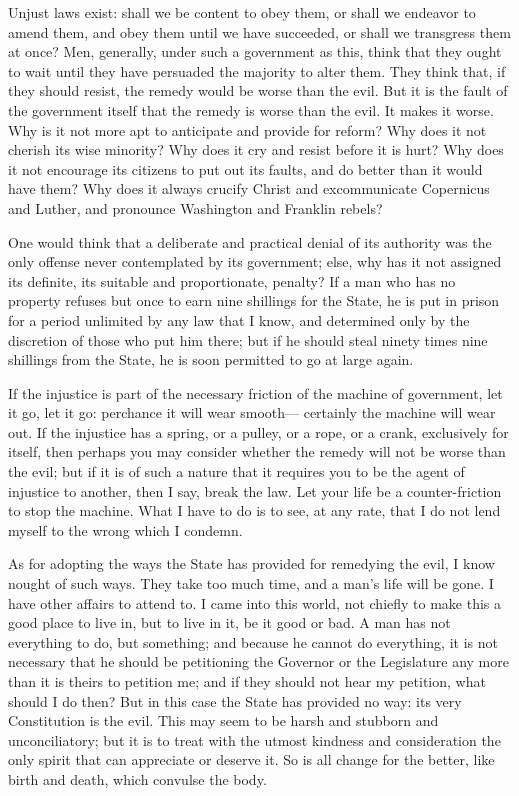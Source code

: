 \documentclass[letterpaper,12pt]{article}
\begin{document}
Unjust laws exist: shall we be content to obey them, or shall we endeavor to
amend them, and obey them until we have succeeded, or shall we transgress them
at once? Men, generally, under such a government as this, think that they ought
to wait until they have persuaded the majority to alter them. They think that,
if they should resist, the remedy would be worse than the evil.  But it is the
fault of the government itself that the remedy is worse than the evil. It makes
it worse. Why is it not more apt to anticipate and provide for reform? Why does
it not cherish its wise minority? Why does it cry and resist before it is hurt?
Why does it not encourage its citizens to put out its faults, and do better than
it would have them? Why does it always crucify Christ and excommunicate
Copernicus and Luther, and pronounce Washington and Franklin rebels?

One would think that a deliberate and practical denial of its authority was the
only offense never contemplated by its government; else, why has it not assigned
its definite, its suitable and proportionate, penalty? If a man who has no
property refuses but once to earn nine shillings for the State, he is put in
prison for a period unlimited by any law that I know, and determined only by the
discretion of those who put him there; but if he should steal ninety times nine
shillings from the State, he is soon permitted to go at large again.

If the injustice is part of the necessary friction of the machine of government,
let it go, let it go: perchance it will wear smooth--- certainly the machine
will wear out. If the injustice has a spring, or a pulley, or a rope, or
a crank, exclusively for itself, then perhaps you may consider whether the
remedy will not be worse than the evil; but if it is of such a nature that it
requires you to be the agent of injustice to another, then I say, break the law.
Let your life be a counter-friction to stop the machine.  What I have to do is
to see, at any rate, that I do not lend myself to the wrong which I condemn.

As for adopting the ways the State has provided for remedying the evil, I know
nought of such ways. They take too much time, and a man's life will be gone.
I have other affairs to attend to. I came into this world, not chiefly to make
this a good place to live in, but to live in it, be it good or bad. A man has
not everything to do, but something; and because he cannot do everything, it is
not necessary that he should be petitioning the Governor or the Legislature any
more than it is theirs to petition me; and if they should not hear my petition,
what should I do then? But in this case the State has provided no way: its very
Constitution is the evil. This may seem to be harsh and stubborn and
unconciliatory; but it is to treat with the utmost kindness and consideration
the only spirit that can appreciate or deserve it.  So is all change for the
better, like birth and death, which convulse the body.
\end{document}
